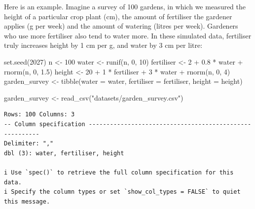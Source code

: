 \documentclass[
  letterpaper,
  8pt,
  a4paper]{book}
\newenvironment{Shaded}{\begin{snugshade}}{\end{snugshade}}
\newcommand{\AttributeTok}[1]{\textcolor[rgb]{0.40,0.45,0.13}{#1}}
\newcommand{\DecValTok}[1]{\textcolor[rgb]{0.68,0.00,0.00}{#1}}
\newcommand{\FloatTok}[1]{\textcolor[rgb]{0.68,0.00,0.00}{#1}}
\newcommand{\FunctionTok}[1]{\textcolor[rgb]{0.28,0.35,0.67}{#1}}
\newcommand{\NormalTok}[1]{\textcolor[rgb]{0.00,0.23,0.31}{#1}}
\newcommand{\OtherTok}[1]{\textcolor[rgb]{0.00,0.23,0.31}{#1}}
\newcommand{\SpecialCharTok}[1]{\textcolor[rgb]{0.37,0.37,0.37}{#1}}
\newcommand{\StringTok}[1]{\textcolor[rgb]{0.13,0.47,0.30}{#1}}
\begin{document}
Here is an example. Imagine a survey of 100 gardens, in which we
measured the height of a particular crop plant (cm), the amount of
fertiliser the gardener applies (g per week) and the amount of watering
(litres per week). Gardeners who use more fertiliser also tend to water
more. In these simulated data, fertiliser truly increases height by 1 cm
per g, and water by 3 cm per litre:

\begin{Shaded}
\begin{Highlighting}[]
\FunctionTok{set.seed}\NormalTok{(}\DecValTok{2027}\NormalTok{)}
\NormalTok{n }\OtherTok{\textless{}{-}} \DecValTok{100}
\NormalTok{water }\OtherTok{\textless{}{-}} \FunctionTok{runif}\NormalTok{(n, }\DecValTok{0}\NormalTok{, }\DecValTok{10}\NormalTok{)}
\NormalTok{fertiliser }\OtherTok{\textless{}{-}} \DecValTok{2} \SpecialCharTok{+} \FloatTok{0.8} \SpecialCharTok{*}\NormalTok{ water }\SpecialCharTok{+} \FunctionTok{rnorm}\NormalTok{(n, }\DecValTok{0}\NormalTok{, }\FloatTok{1.5}\NormalTok{)}
\NormalTok{height }\OtherTok{\textless{}{-}} \DecValTok{20} \SpecialCharTok{+} \DecValTok{1} \SpecialCharTok{*}\NormalTok{ fertiliser }\SpecialCharTok{+} \DecValTok{3} \SpecialCharTok{*}\NormalTok{ water }\SpecialCharTok{+} \FunctionTok{rnorm}\NormalTok{(n, }\DecValTok{0}\NormalTok{, }\DecValTok{4}\NormalTok{)}
\NormalTok{garden\_survey }\OtherTok{\textless{}{-}} \FunctionTok{tibble}\NormalTok{(}\AttributeTok{water =}\NormalTok{ water, }\AttributeTok{fertiliser =}\NormalTok{ fertiliser, }\AttributeTok{height =}\NormalTok{ height)}
\end{Highlighting}
\end{Shaded}

\begin{Shaded}
\begin{Highlighting}[]
\NormalTok{garden\_survey }\OtherTok{\textless{}{-}} \FunctionTok{read\_csv}\NormalTok{(}\StringTok{"datasets/garden\_survey.csv"}\NormalTok{)}
\end{Highlighting}
\end{Shaded}

\begin{verbatim}
Rows: 100 Columns: 3
-- Column specification --------------------------------------------------------
Delimiter: ","
dbl (3): water, fertiliser, height

i Use `spec()` to retrieve the full column specification for this data.
i Specify the column types or set `show_col_types = FALSE` to quiet this message.
\end{verbatim}
\end{document}
